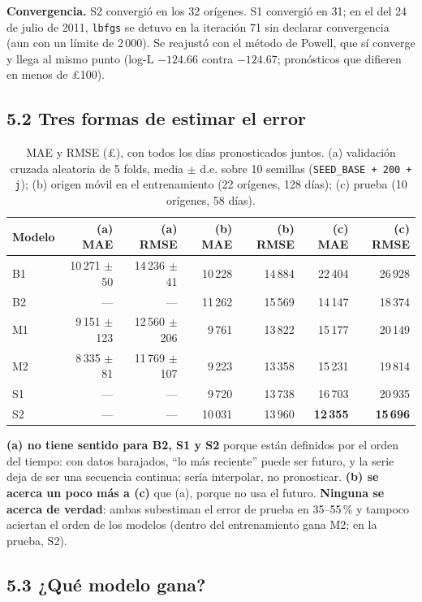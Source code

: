 \documentclass[11pt,letterpaper]{article}
\newcommand{\lib}{\pounds}
\begin{document}
\textbf{Convergencia.} S2 convergió en los 32 orígenes. S1 convergió en 31; en el del 24 de julio de 2011, \texttt{lbfgs} se detuvo en la iteración 71 sin declarar convergencia (aun con un límite de 2\,000). Se reajustó con el método de Powell, que sí converge y llega al mismo punto (log-L $-124.66$ contra $-124.67$; pronósticos que difieren en menos de \lib100).

\subsection*{5.2 Tres formas de estimar el error}

\begin{table}[H]
\centering
\caption{MAE y RMSE (\lib), con todos los días pronosticados juntos. (a) validación cruzada aleatoria de 5 folds, media $\pm$ d.e. sobre 10 semillas (\texttt{SEED\_BASE + 200 + j}); (b) origen móvil en el entrenamiento (22 orígenes, 128 días); (c) prueba (10 orígenes, 58 días).}
\small
\begin{tabular}{lrrrrrr}
\toprule
Modelo & (a) MAE & (a) RMSE & (b) MAE & (b) RMSE & (c) MAE & (c) RMSE\\
\midrule
B1 & 10\,271 $\pm$ 50 & 14\,236 $\pm$ 41 & 10\,228 & 14\,884 & 22\,404 & 26\,928\\
B2 & --- & --- & 11\,262 & 15\,569 & 14\,147 & 18\,374\\
M1 & 9\,151 $\pm$ 123 & 12\,560 $\pm$ 206 & 9\,761 & 13\,822 & 15\,177 & 20\,149\\
M2 & 8\,335 $\pm$ 81 & 11\,769 $\pm$ 107 & 9\,223 & 13\,358 & 15\,231 & 19\,814\\
S1 & --- & --- & 9\,720 & 13\,738 & 16\,703 & 20\,935\\
S2 & --- & --- & 10\,031 & 13\,960 & \textbf{12\,355} & \textbf{15\,696}\\
\bottomrule
\end{tabular}
\end{table}

\textbf{(a) no tiene sentido para B2, S1 y S2} porque están definidos por el orden del tiempo: con datos barajados, ``lo más reciente'' puede ser futuro, y la serie deja de ser una secuencia continua; sería interpolar, no pronosticar. \textbf{(b) se acerca un poco más a (c)} que (a), porque no usa el futuro. \textbf{Ninguna se acerca de verdad}: ambas subestiman el error de prueba en 35--55\,\% y tampoco aciertan el orden de los modelos (dentro del entrenamiento gana M2; en la prueba, S2).

\subsection*{5.3 ¿Qué modelo gana?}
\end{document}
